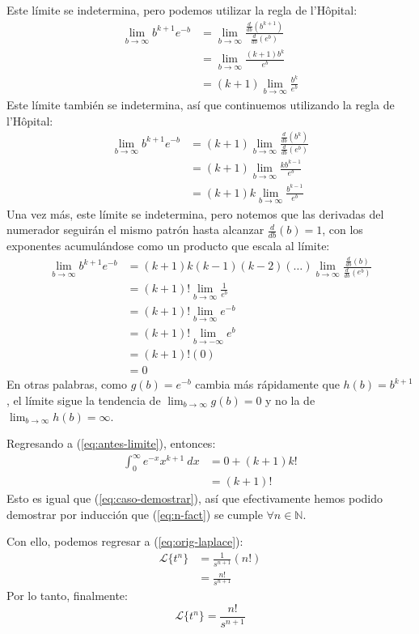 \documentclass[12pt, a4paper]{article}
\begin{document}
Este límite se indetermina, pero podemos utilizar la regla de l'Hôpital:
\begin{align*}
	\lim_{b \to \infty} b^{k+1} e^{-b} &= \lim_{b \to \infty} \frac{\frac{d}{db} \left( b^{k+1} \right)}{\frac{d}{db} \left( e^{b} \right)} \\
	&= \lim_{b \to \infty} \frac{(k+1)b^{k}}{e^{b}} \\
	&= (k+1) \lim_{b \to \infty} \frac{b^{k}}{e^{b}}
\end{align*}
Este límite también se indetermina, así que continuemos utilizando la regla de l'Hôpital:
\begin{align*}
	\lim_{b \to \infty} b^{k+1} e^{-b} &= (k+1) \lim_{b \to \infty} \frac{\frac{d}{db} \left( b^{k} \right)}{\frac{d}{db} \left( e^{b} \right)} \\
	&= (k+1) \lim_{b \to \infty} \frac{kb^{k-1}}{e^{b}} \\
	&= (k+1)k \lim_{b \to \infty} \frac{b^{k-1}}{e^{b}}
\end{align*}
Una vez más, este límite se indetermina, pero notemos que las derivadas del numerador seguirán el mismo patrón hasta alcanzar \(\frac{d}{db} (b) = 1\), con los exponentes acumulándose como un producto que escala al límite:
\begin{align*}
	\lim_{b \to \infty} b^{k+1} e^{-b} &= (k+1)k(k-1)(k-2)(\dots) \lim_{b \to \infty} \frac{\frac{d}{db} (b)}{\frac{d}{db} \left( e^{b} \right)} \\
	&= (k+1)! \lim_{b \to \infty} \frac{1}{e^{b}} \\
	&= (k+1)! \lim_{b \to \infty} e^{-b} \\
	&= (k+1)! \lim_{b \to -\infty} e^{b} \\
	&= (k+1)! (0) \\
	&= 0
\end{align*}
En otras palabras, como \(g(b) = e^{-b}\) cambia más rápidamente que \(h(b) = b^{k+1}\), el límite sigue la tendencia de \(\lim_{b \to \infty} g(b) = 0\) y no la de \(\lim_{b \to \infty} h(b) = \infty\).

Regresando a (\ref{eq:antes-limite}), entonces:
\begin{align*}
	\int_{0}^{\infty} e^{-x} x^{k+1} \ dx &= 0 + (k+1) k! \\
	&= (k+1)!
\end{align*}
Esto es igual que (\ref{eq:caso-demostrar}), así que efectivamente hemos podido demostrar por inducción que (\ref{eq:n-fact}) se cumple \(\forall n \in \mathbb{N}\).

Con ello, podemos regresar a (\ref{eq:orig-laplace}):
\begin{align*}
	\mathcal{L}\{t^{n}\} &= \frac{1}{s^{n+1}} (n!) \\
	&= \frac{n!}{s^{n+1}}
\end{align*}
Por lo tanto, finalmente:
\[
\mathcal{L}\{t^n\}=\frac{n!}{s^{n+1}}
\]
\end{document}
